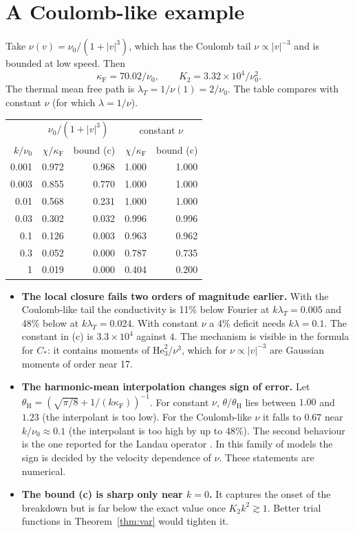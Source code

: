 \documentclass[11pt]{article}
\newcommand{\He}{\mathrm{He}}
\theoremstyle{remark}
\begin{document}
\section{A Coulomb-like example}

Take $\nu(v) = \nu_0/(1+|v|^3)$, which has the Coulomb tail
$\nu\propto|v|^{-3}$ and is bounded at low speed. Then
\[
  \kappa_{\mathrm F} = 70.02/\nu_0,\qquad K_2 = 3.32\times10^4/\nu_0^2 .
\]
The thermal mean free path is $\lambda_T = 1/\nu(1) = 2/\nu_0$. The table
compares with constant $\nu$ (for which $\lambda=1/\nu$).
\begin{center}
\renewcommand{\arraystretch}{1.2}
\begin{tabular}{rrrrr}
  & \multicolumn{2}{c}{$\nu_0/(1+|v|^3)$}
  & \multicolumn{2}{c}{constant $\nu$} \\
  $k/\nu_0$ & $\chi/\kappa_{\mathrm F}$ & bound (c)
            & $\chi/\kappa_{\mathrm F}$ & bound (c) \\ \hline
  0.001 & 0.972 & 0.968 & 1.000 & 1.000 \\
  0.003 & 0.855 & 0.770 & 1.000 & 1.000 \\
  0.01  & 0.568 & 0.231 & 1.000 & 1.000 \\
  0.03  & 0.302 & 0.032 & 0.996 & 0.996 \\
  0.1   & 0.126 & 0.003 & 0.963 & 0.962 \\
  0.3   & 0.052 & 0.000 & 0.787 & 0.735 \\
  1     & 0.019 & 0.000 & 0.404 & 0.200 \\
\end{tabular}
\end{center}

\begin{itemize}
  \item \textbf{The local closure fails two orders of magnitude earlier.}
    With the Coulomb-like tail the conductivity is 11\% below Fourier at
    $k\lambda_T = 0.005$ and 48\% below at $k\lambda_T = 0.024$. With
    constant $\nu$ a 4\% deficit needs $k\lambda = 0.1$. The constant in (c)
    is $3.3\times10^4$ against $4$. The mechanism is visible in the formula
    for $C_*$: it contains moments of $\He_3^2/\nu^3$, which for
    $\nu\propto|v|^{-3}$ are Gaussian moments of order near 17.
  \item \textbf{The harmonic-mean interpolation changes sign of error.} Let
    $\theta_{\mathrm H} = (\sqrt{\pi/8} + 1/(k\kappa_{\mathrm F}))^{-1}$. For
    constant $\nu$, $\theta/\theta_{\mathrm H}$ lies between $1.00$ and
    $1.23$ (the interpolant is too low). For the Coulomb-like $\nu$ it falls
    to $0.67$ near $k/\nu_0\approx0.1$ (the interpolant is too high by up to
    48\%). The second behaviour is the one reported for the Landau operator
    \cite{Brodrick}. In this family of models the sign is decided by the
    velocity dependence of $\nu$. These statements are numerical.
  \item \textbf{The bound (c) is sharp only near $k=0$.} It captures the
    onset of the breakdown but is far below the exact value once
    $K_2k^2\gtrsim1$. Better trial functions in Theorem~\ref{thm:var} would
    tighten it.
\end{itemize}
\end{document}
